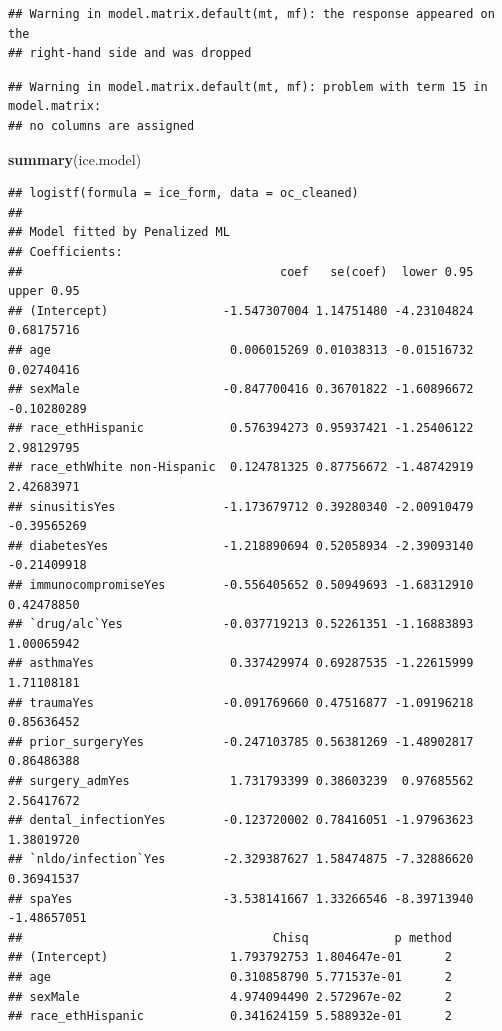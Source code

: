 \documentclass[
]{article}
\newenvironment{Shaded}{\begin{snugshade}}{\end{snugshade}}
\newcommand{\FunctionTok}[1]{\textcolor[rgb]{0.13,0.29,0.53}{\textbf{#1}}}
\newcommand{\NormalTok}[1]{#1}
\begin{document}
\begin{verbatim}
## Warning in model.matrix.default(mt, mf): the response appeared on the
## right-hand side and was dropped
\end{verbatim}

\begin{verbatim}
## Warning in model.matrix.default(mt, mf): problem with term 15 in model.matrix:
## no columns are assigned
\end{verbatim}

\begin{Shaded}
\begin{Highlighting}[]
\FunctionTok{summary}\NormalTok{(ice.model)}
\end{Highlighting}
\end{Shaded}

\begin{verbatim}
## logistf(formula = ice_form, data = oc_cleaned)
## 
## Model fitted by Penalized ML
## Coefficients:
##                                    coef   se(coef)  lower 0.95  upper 0.95
## (Intercept)                -1.547307004 1.14751480 -4.23104824  0.68175716
## age                         0.006015269 0.01038313 -0.01516732  0.02740416
## sexMale                    -0.847700416 0.36701822 -1.60896672 -0.10280289
## race_ethHispanic            0.576394273 0.95937421 -1.25406122  2.98129795
## race_ethWhite non-Hispanic  0.124781325 0.87756672 -1.48742919  2.42683971
## sinusitisYes               -1.173679712 0.39280340 -2.00910479 -0.39565269
## diabetesYes                -1.218890694 0.52058934 -2.39093140 -0.21409918
## immunocompromiseYes        -0.556405652 0.50949693 -1.68312910  0.42478850
## `drug/alc`Yes              -0.037719213 0.52261351 -1.16883893  1.00065942
## asthmaYes                   0.337429974 0.69287535 -1.22615999  1.71108181
## traumaYes                  -0.091769660 0.47516877 -1.09196218  0.85636452
## prior_surgeryYes           -0.247103785 0.56381269 -1.48902817  0.86486388
## surgery_admYes              1.731793399 0.38603239  0.97685562  2.56417672
## dental_infectionYes        -0.123720002 0.78416051 -1.97963623  1.38019720
## `nldo/infection`Yes        -2.329387627 1.58474875 -7.32886620  0.36941537
## spaYes                     -3.538141667 1.33266546 -8.39713940 -1.48657051
##                                   Chisq            p method
## (Intercept)                 1.793792753 1.804647e-01      2
## age                         0.310858790 5.771537e-01      2
## sexMale                     4.974094490 2.572967e-02      2
## race_ethHispanic            0.341624159 5.588932e-01      2

\end{verbatim}
\end{document}
